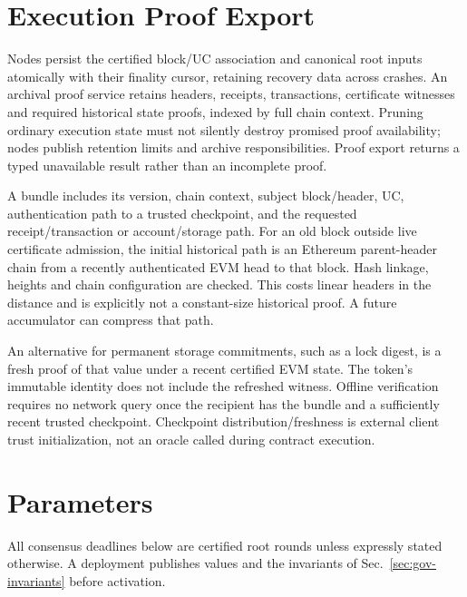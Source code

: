 \section{Execution Proof Export}\label{app:evm-proof-export}

Nodes persist the certified block/UC association and canonical root inputs atomically with their finality cursor, retaining recovery data across crashes. An archival proof service retains headers, receipts, transactions, certificate witnesses and required historical state proofs, indexed by full chain context. Pruning ordinary execution state must not silently destroy promised proof availability; nodes publish retention limits and archive responsibilities. Proof export returns a typed unavailable result rather than an incomplete proof.

A bundle includes its version, chain context, subject block/header, UC, authentication path to a trusted checkpoint, and the requested receipt/transaction or account/storage path. For an old block outside live certificate admission, the initial historical path is an Ethereum parent-header chain from a recently authenticated EVM head to that block. Hash linkage, heights and chain configuration are checked. This costs linear headers in the distance and is explicitly not a constant-size historical proof. A future accumulator can compress that path.

An alternative for permanent storage commitments, such as a lock digest, is a fresh proof of that value under a recent certified EVM state. The token's immutable identity does not include the refreshed witness. Offline verification requires no network query once the recipient has the bundle and a sufficiently recent trusted checkpoint. Checkpoint distribution/freshness is external client trust initialization, not an oracle called during contract execution.

\section{Parameters}\label{app:gov-params}

All consensus deadlines below are certified root rounds unless expressly stated otherwise. A deployment publishes values and the invariants of Sec.~\ref{sec:gov-invariants} before activation.

